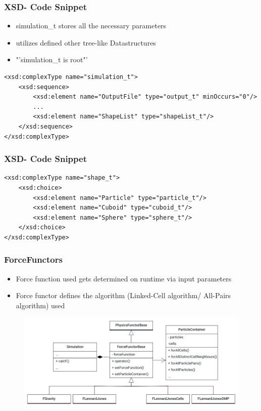 \begin{frame}[fragile]
	\frametitle{XSD- Code Snippet}
	\large
	\begin{itemize}
		\item simulation\_t stores all the necessary parameters
		\item utilizes defined other tree-like Datastructures
		\item "'simulation\_t is root"'
	\end{itemize}
	
	\vspace{0.3cm}
	
	\begin{lstlisting}
<xsd:complexType name="simulation_t">
	<xsd:sequence>
		<xsd:element name="OutputFile" type="output_t" minOccurs="0"/>
		...
		<xsd:element name="ShapeList" type="shapeList_t"/>
	</xsd:sequence>
</xsd:complexType>
	\end{lstlisting}
\end{frame}

\begin{frame}[fragile]
	\frametitle{XSD- Code Snippet}
	\large
	\vspace{2cm}
	\begin{lstlisting}
<xsd:complexType name="shape_t">
	<xsd:choice>
		<xsd:element name="Particle" type="particle_t"/>
		<xsd:element name="Cuboid" type="cuboid_t"/>
		<xsd:element name="Sphere" type="sphere_t"/>
	</xsd:choice>
</xsd:complexType>
	\end{lstlisting}
	
\end{frame}

\begin{frame}
	\frametitle{ForceFunctors}
	\large
	\begin{itemize}
		\item Force function used gets determined on runtime via input parameters
		\item Force functor defines the algorithm (Linked-Cell algorithm/ All-Pairs algorithm) used
	\end{itemize}
	\vspace{-0.4cm}
	
	\begin{figure}
		\centering
		\includegraphics[width=0.8\linewidth]{ForceFunctorMolSim}
		\label{fig:forcefunctormolsim}
	\end{figure}
	
\end{frame}

